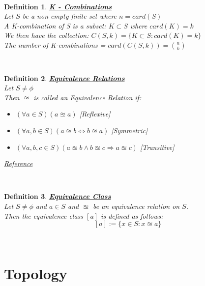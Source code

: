 \documentclass[12pt]{extarticle}
\theoremstyle{plain}
\theoremstyle{plain}
\theoremstyle{plain}
\theoremstyle{Definition}
\newtheorem{def.}{Definition}[section]
\theoremstyle{Definition}
\theoremstyle{plain}
\theoremstyle{plain}
\newcommand{\cut}[0]{\noindent\framebox[\linewidth]{\rule{\linewidth}{2pt}}\\}
\begin{document}
\cut
\begin{def.} \underline{\textbf{K - Combinations}} \\
	Let $S$ be a non empty finite set where $n = card(S)$ \\ 
	A K-combination of S is a subset: $K \subset S$ where $card(K) = k$ \\ 
	We then have the collection: $C(S,k) = \{K \subset S : card(K) = k\}$ \\
	The number of K-combinations = $card(C(S,k)) = \binom{n}{k}$
\end{def.}
\cut
\begin{def.} \underline{\textbf{Equivalence Relations}} \\
	Let $S \not = \phi$ \\ 
	Then $\approxeq$ is called an Equivalence Relation if: 
	\begin{itemize}
		\item $(\forall a \in S)(a \approxeq a)$ \hfill [Reflexive]
		\item $(\forall a,b \in S)(a \approxeq b \Leftrightarrow b \approxeq a)$ \hfill [Symmetric]
		\item $(\forall a,b,c \in S)(a \approxeq b \wedge b \approxeq c \Rightarrow a \approxeq c)$ \hfill [Transitive] 
	\end{itemize}
\href{https://en.wikipedia.org/wiki/Equivalence_relation}{Reference}
\end{def.}
\cut
\begin{def.} \underline{\textbf{Equivalence Class}} \\
	Let $S \not = \phi$ and $a \in S$ and $\approxeq$ be an equivalence relation on $S$. \\
	Then the equivalence class $[a]$ is defined as follows: 
		$$[a] := \{x \in S : x \approxeq a\}$$
\end{def.}
\cut
\section{Topology}
\end{document}
